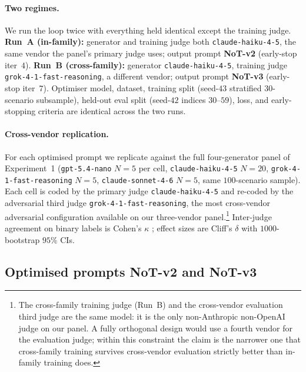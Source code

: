 \documentclass[11pt]{article}
\begin{document}
\paragraph{Two regimes.} We run the loop twice with everything held
identical except the training judge. \textbf{Run~A (in-family):}
generator and training judge both \texttt{claude-haiku-4-5}, the same
vendor the panel's primary judge uses; output prompt \textbf{NoT-v2}
(early-stop iter~$4$). \textbf{Run~B (cross-family):} generator
\texttt{claude-haiku-4-5}, training judge
\texttt{grok-4-1-fast-reasoning}, a different vendor; output prompt
\textbf{NoT-v3} (early-stop iter~$7$). Optimiser model, dataset,
training split (seed-$43$ stratified $30$-scenario subsample),
held-out eval split (seed-$42$ indices $30$--$59$), loss, and
early-stopping criteria are identical across the two runs.

\paragraph{Cross-vendor replication.} For each optimised prompt we
replicate against the full four-generator panel of Experiment~1
(\texttt{gpt-5.4-nano} $N{=}5$ per cell, \texttt{claude-haiku-4-5}
$N{=}20$, \texttt{grok-4-1-fast-reasoning} $N{=}5$,
\texttt{claude-sonnet-4-6} $N{=}5$, same $100$-scenario sample). Each
cell is coded by the primary judge \texttt{claude-haiku-4-5} and
re-coded by the adversarial third judge
\texttt{grok-4-1-fast-reasoning}, the most cross-vendor adversarial
configuration available on our three-vendor panel.\footnote{The
cross-family training judge (Run~B) and the cross-vendor evaluation
third judge are the same model: it is the only non-Anthropic
non-OpenAI judge on our panel. A fully orthogonal design would use a
fourth vendor for the evaluation judge; within this constraint the
claim is the narrower one that cross-family training survives
cross-vendor evaluation strictly better than in-family training does.}
Inter-judge agreement on binary labels is Cohen's $\kappa$
\citep{cohen60}; effect sizes are Cliff's $\delta$ \citep{cliff93}
with $1000$-bootstrap $95\%$ CIs.

\subsection{Optimised prompts NoT-v2 and NoT-v3}
\label{app:tg-prompts}
\end{document}

